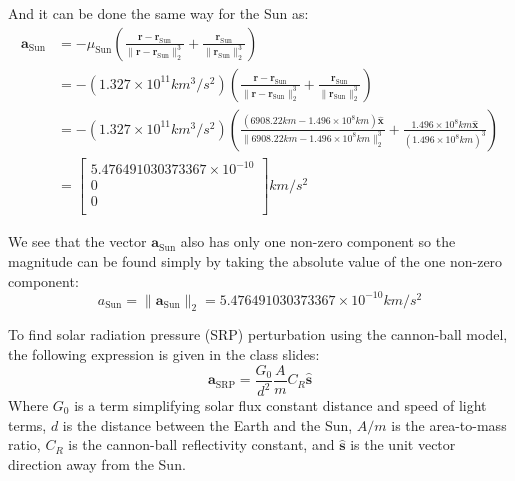 \documentclass[titlepage]{article}
\begin{document}
And it can be done the same way for the Sun as:
\footnotesize
\begin{equation}
	\begin{split}
		\boldsymbol{a}_\text{Sun}&=-\mu_\text{Sun}\left(\frac{\boldsymbol{r}-\boldsymbol{r}_\text{Sun}}{\|\boldsymbol{r}-\boldsymbol{r}_\text{Sun}\|_2^3}+\frac{\boldsymbol{r}_\text{Sun}}{\|\boldsymbol{r}_\text{Sun}\|_2^3}\right)\\
		&=-\left(1.327\times10^{11}km^3/s^2\right)\left(\frac{\boldsymbol{r}-\boldsymbol{r}_\text{Sun}}{\|\boldsymbol{r}-\boldsymbol{r}_\text{Sun}\|_2^3}+\frac{\boldsymbol{r}_\text{Sun}}{\|\boldsymbol{r}_\text{Sun}\|_2^3}\right)\\
		&=-\left(1.327\times10^{11}km^3/s^2\right)\left(\frac{(6908.22km-1.496\times10^8km)\hat{\boldsymbol{x}}}{\|6908.22km-1.496\times10^8km\|_2^3}+\frac{1.496\times10^8km\hat{\boldsymbol{x}}}{(1.496\times10^8km)^3}\right)\\
		&=\begin{bmatrix}
			5.476491030373367\times10^{-10} \\
			0 \\
			0 \\
		\end{bmatrix}km/s^2
	\end{split}
\end{equation}
\normalsize
\begin{mdframed}[linewidth=1pt, innertopmargin=10pt, innerbottommargin=10pt]
	We see that the vector $\boldsymbol{a}_\text{Sun}$ also has only one non-zero component so the magnitude can be found simply by taking the absolute value of the one non-zero component:
	\begin{equation}
		a_\text{Sun} = \|\boldsymbol{a}_\text{Sun}\|_2=5.476491030373367\times10^{-10}km/s^2
	\end{equation}
\end{mdframed}

To find solar radiation pressure (SRP) perturbation using the cannon-ball model, the following expression is given in the class slides:
\begin{equation}
	\boldsymbol{a}_{\text{SRP}}=\frac{G_0}{d^2}\frac{A}{m}C_R\hat{\boldsymbol{s}}
\end{equation}
Where $G_0$ is a term simplifying solar flux constant distance and speed of light terms, $d$ is the distance between the Earth and the Sun, $A/m$ is the area-to-mass ratio, $C_R$ is the cannon-ball reflectivity constant, and $\hat{\boldsymbol{s}}$ is the unit vector direction away from the Sun.\\
\end{document}
